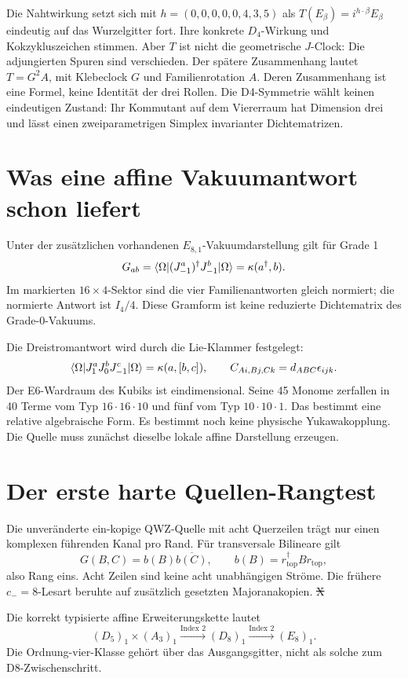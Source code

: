 Die Nahtwirkung setzt sich mit $h=(0,0,0,0,0,4,3,5)$ als $T(E_\beta)=i^{h\cdot\beta}E_\beta$ eindeutig auf das Wurzelgitter fort. Ihre konkrete $D_4$-Wirkung und Kokzykluszeichen stimmen. Aber $T$ ist nicht die geometrische $J$-Clock: Die adjungierten Spuren sind verschieden. Der spätere Zusammenhang lautet $T=G^2A$, mit Klebeclock $G$ und Familienrotation $A$. Deren Zusammenhang ist eine Formel, keine Identität der drei Rollen. Die D4-Symmetrie wählt keinen eindeutigen Zustand: Ihr Kommutant auf dem Viererraum hat Dimension drei und lässt einen zweiparametrigen Simplex invarianter Dichtematrizen. 

\section{Was eine affine Vakuumantwort schon liefert}
Unter der zusätzlichen vorhandenen $E_{8,1}$-Vakuumdarstellung gilt für Grade 1
\[
 G_{ab}=\langle \Omega\rvert(J^a_{-1})^\dagger J^b_{-1}\lvert \Omega\rangle
       =\kappa(a^\dagger,b).
\]
Im markierten $16\times4$-Sektor sind die vier Familienantworten gleich normiert; die normierte Antwort ist $I_4/4$. Diese Gramform ist keine reduzierte Dichtematrix des Grade-0-Vakuums. 

Die Dreistromantwort wird durch die Lie-Klammer festgelegt:
\[
 \langle \Omega\rvert J^a_1J^b_0J^c_{-1}\lvert \Omega\rangle
 =\kappa(a,[b,c]),\qquad C_{Ai,Bj,Ck}=d_{ABC}\epsilon_{ijk}.
\]
Der E6-Wardraum des Kubiks ist eindimensional. Seine 45 Monome zerfallen in 40 Terme vom Typ $16\cdot16\cdot10$ und fünf vom Typ $10\cdot10\cdot1$. Das bestimmt eine relative algebraische Form. Es bestimmt noch keine physische Yukawakopplung. Die Quelle muss zunächst dieselbe lokale affine Darstellung erzeugen. 

\section{Der erste harte Quellen-Rangtest}
Die unveränderte ein-kopige QWZ-Quelle mit acht Querzeilen trägt nur einen komplexen führenden Kanal pro Rand. Für transversale Bilineare gilt
\[
 G(B,C)=b(B)\overline{b(C)},\qquad b(B)=r_{\mathrm{top}}^\dagger Br_{\mathrm{top}},
\]
also Rang eins. Acht Zeilen sind keine acht unabhängigen Ströme. Die frühere $c_-=8$-Lesart beruhte auf zusätzlich gesetzten Majoranakopien. \st{X} 

Die korrekt typisierte affine Erweiterungskette lautet
\[
 (D_5)_1\times(A_3)_1\xrightarrow{\text{Index }2}(D_8)_1
 \xrightarrow{\text{Index }2}(E_8)_1.
\]
Die Ordnung-vier-Klasse gehört über das Ausgangsgitter, nicht als solche zum D8-Zwischenschritt. 

